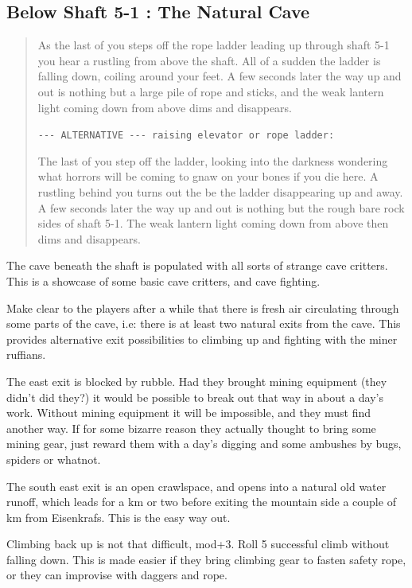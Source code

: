\documentclass[11pt, twoside, titlepage, a4paper]{report}
\newenvironment{readoutloud}%
{\begin{quote}\begin{itshape}}%
{\end{itshape}\end{quote}}%
\begin{document}
\subsection*{Below Shaft 5-1 : The Natural Cave}
\begin{readoutloud}
As the last of you steps off the rope ladder leading up through shaft 5-1 you hear a rustling from above the shaft. All of a sudden the ladder is falling down, coiling around your feet. A few seconds later the way up and out is nothing but a large pile of rope and sticks, and the weak lantern light coming down from above dims and disappears.

\verb|--- ALTERNATIVE --- raising elevator or rope ladder:|

The last of you step off the ladder, looking into the darkness wondering what horrors will be coming to gnaw on your bones if you die here. A rustling behind you turns out the be the ladder disappearing up and away. A few seconds later the way up and out is nothing but the rough bare rock sides of shaft 5-1. The weak lantern light coming down from above then dims and disappears.
\end{readoutloud}

The cave beneath the shaft is populated with all sorts of strange cave critters.
This is a showcase of some basic cave critters, and cave fighting.

Make clear to the players after a while that there is fresh air circulating through some parts of the cave, i.e: there is at least two natural exits from the cave. This provides alternative exit possibilities to climbing up and fighting with the miner ruffians.

The east exit is blocked by rubble. Had they brought mining equipment (they didn't did they?) it would be possible to break out that way in about a day's work. Without mining equipment it will be impossible, and they must find another way. If for some bizarre reason they actually thought to bring some mining gear, just reward them with a day's digging and some ambushes by bugs, spiders or whatnot.

The south east exit is an open crawlspace, and opens into a natural old water runoff, which leads for a km or two before exiting the mountain side a couple of km from Eisenkrafs. This is the easy way out.

Climbing back up is not that difficult, mod+3. Roll 5 successful climb without falling down. This is made easier if they bring climbing gear to fasten safety rope, or they can improvise with daggers and rope.
\end{document}
